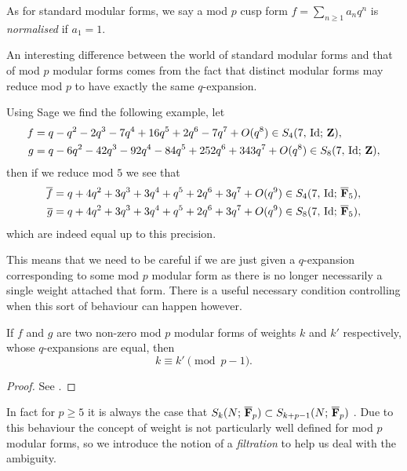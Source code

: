 \documentclass[a4paper,12pt]{article}
\begin{document}
\begin{defn}
As for standard modular forms, we say a mod $p$ cusp form $f = \sum_{n\ge 1} a_n q^n$
is \emph{normalised} if $a_1 = 1$.
\end{defn}

An interesting difference between the world of standard modular forms and that of mod $p$ modular forms comes from the fact that distinct modular forms may reduce mod $p$ to have exactly the same $q$-expansion.
\begin{ex}
Using Sage \cite{Sage} we find the following example, let
\begin{align*}
f &= q - q^{2} - 2q^{3} - 7q^{4} + 16q^{5} + 2q^{6} - 7q^{7} + O(q^{8}) \in S_{4}(7,\,\mathrm{Id};\,\mathbf{Z}),\\
g &= q - 6q^{2} - 42q^{3} - 92q^{4} - 84q^{5} + 252q^{6} + 343q^{7} + O(q^{8}) \in S_{8}(7,\,\mathrm{Id};\,\mathbf{Z}),
\end{align*}
then if we reduce mod $5$ we see that
\begin{align*}
\overline{f} &= q + 4q^{2} + 3q^{3} + 3q^{4} + q^{5} + 2q^{6} + 3q^{7} + O(q^{9}) \in S_{4}(7,\,\mathrm{Id};\,\overline{\mathbf{F}}_5),\\
\overline{g} &= q + 4q^{2} + 3q^{3} + 3q^{4} + q^{5} + 2q^{6} + 3q^{7} + O(q^{9}) \in S_{8}(7,\,\mathrm{Id};\,\overline{\mathbf{F}}_5),
\end{align*}
which are indeed equal up to this precision.
\end{ex}

This means that we need to be careful if we are just given a $q$-expansion corresponding to some mod $p$ modular form as there is no longer necessarily a single weight attached that form.
There is a useful necessary condition controlling when this sort of behaviour can happen however.

\begin{prop}\label{prop:pm1}
If $f$ and $g$ are two non-zero mod $p$ modular forms of weights $k$ and $k'$ respectively, whose $q$-expansions are equal, then
\[
k \equiv k' \pmod{p-1}.
\]
\end{prop}
\begin{proof}
See \cite{Serre73}.
\end{proof}

In fact for $p\ge 5$ it is always the case that $S_{k}(N;\,\overline{\mathbf{F}}_p)\subset S_{k + p - 1}(N;\,\overline{\mathbf{F}}_p)$ \cite{Serre73Formes}.
Due to this behaviour the concept of weight is not particularly well defined for mod $p$ modular forms, so we introduce the notion of a \emph{filtration} to help us deal with the ambiguity.
\end{document}
